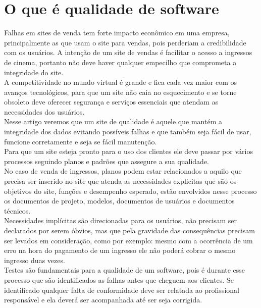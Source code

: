 \documentclass[12pt]{article}
\begin{document}
    \section{O que é qualidade de software}
        Falhas em sites de venda tem forte impacto econômico em uma empresa, principalmente as que usam o site para vendas, pois perderiam a credibilidade com os usuários. A intenção de um site de vendas é facilitar o acesso a ingressos de cinema, portanto não deve haver qualquer empecilho que comprometa a integridade do site.\\
        A competitividade no mundo virtual é grande e fica cada vez maior com os avanços tecnológicos, para que um site não caia no esquecimento e se torne obsoleto deve oferecer segurança e serviços essenciais que atendam as necessidades dos usuários.\\
        Nesse artigo veremos que um site de qualidade é aquele que mantém a integridade dos dados evitando possíveis falhas e que também seja fácil de usar, funcione corretamente e seja se fácil manutenção.\\
        Para que um site esteja pronto para o uso dos clientes ele deve passar por vários processos seguindo planos e padrões que assegure a sua qualidade.\\
        No caso de venda de ingressos, planos podem estar relacionados a aquilo que precisa ser inserido no site que atenda as necessidades explicitas que são os objetivos do site, funções e desempenho esperado, estão envolvidos nesse processo os documentos de projeto, modelos, documentos de usuários e documentos técnicos.\\
        Necessidades implícitas são direcionadas para os usuários, não precisam ser declarados por serem óbvios, mas que pela gravidade das consequências precisam ser levados em consideração, como por exemplo: mesmo com a ocorrência de um erro na hora do pagamento de um ingresso ele não poderá cobrar o mesmo ingresso duas vezes.\\
        Testes são fundamentais para a qualidade de um software, pois é durante esse processo que são identificados as falhas antes que cheguem aos clientes. Se identificado qualquer falta de conformidade deve ser relatada ao profissional responsável e ela deverá ser acompanhada até ser seja corrigida.\\
        
\end{document}
